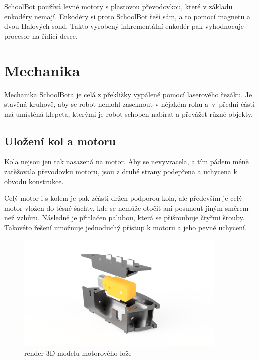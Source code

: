 \documentclass{template/socthesis}
\begin{document}
SchoolBot používá levné motory s plastovou převodovkou, které v základu enkodéry nemají. Enkodéry si proto SchoolBot řeší sám, a to pomocí magnetu a dvou Halových sond. Takto vyrobený inkrementální enkodér pak vyhodnocuje procesor na řídící desce.

\newpage

\section{Mechanika}

Mechanika SchoolBota je celá z překližky vypálené pomocí laserového řezáku. Je stavěná kruhově, aby se robot nemohl zaseknout v nějakém rohu a~v~přední části má umístěná klepeta, kterými je robot schopen nabírat a převážet různé objekty. 

\subsection{Uložení kol a motoru}

Kola nejsou jen tak nasazená na motor. Aby se nevyvracela, a tím pádem méně zatěžovala převodovku motoru, jsou z druhé strany podepřena a uchycena k obvodu konstrukce.

Celý motor i s kolem je pak zčásti držen podporou kola, ale především je celý motor vložen do těsné šachty, kde se nemůže otočit ani posunout jiným směrem než vzhůru. Následně je přitlačen palubou, která se přišroubuje čtyřmi šrouby. Takovéto řešení umožnuje jednoduchý přístup k motoru a jeho pevné uchycení.

\begin{figure}[h]
	\centering
	\includegraphics[width=0.893\textwidth]{img/ulozeni_motoru.png}
	\caption{render 3D modelu motorového lože}
\end{figure}

\newpage
\end{document}
